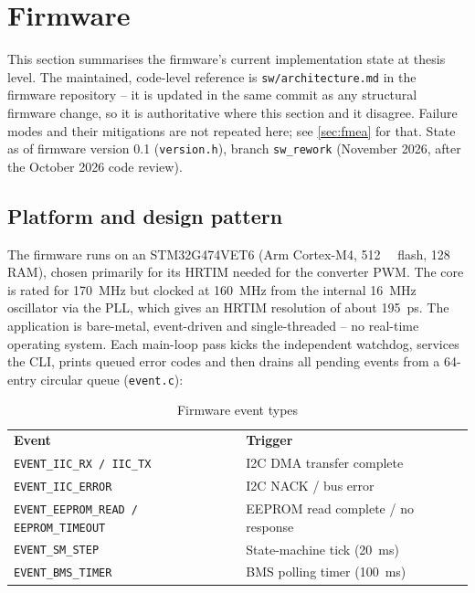 \section{Firmware}
\label{sec:firmware}

This section summarises the firmware's current implementation state at
thesis level. The maintained, code-level reference is
\texttt{sw/architecture.md} in the firmware repository -- it is updated in
the same commit as any structural firmware change, so it is authoritative
where this section and it disagree. Failure modes and their mitigations are
not repeated here; see \autoref{sec:fmea} for that. State as of firmware
version 0.1 (\texttt{version.h}), branch \texttt{sw\_rework} (November 2026,
after the October 2026 code review).

\FloatBarrier

\subsection{Platform and design pattern}

The firmware runs on an STM32G474VET6 (Arm Cortex-M4, \qty{512}{\kibi\byte} flash, \qty{128}{\kibi\byte} RAM), chosen primarily for its \ac{HRTIM} needed for the converter \ac{PWM}. The core is rated for \qty{170}{\mega\hertz} but clocked at \qty{160}{\mega\hertz} from the internal \qty{16}{\mega\hertz} oscillator via the PLL, which gives an \ac{HRTIM} resolution of about \qty{195}{\pico\second}. The application is bare-metal, event-driven and single-threaded -- no real-time operating system. Each main-loop pass kicks the independent watchdog, services the \ac{CLI}, prints queued error codes and then drains all pending events from a 64-entry circular queue (\texttt{event.c}):

\begin{table}[h!]
    \centering
    \begin{tabular}{ll}
        \rowcolor{gray} \textbf{Event} & \textbf{Trigger} \\
        \texttt{EVENT\_IIC\_RX / IIC\_TX} & \ac{I2C} \ac{DMA} transfer complete \\
        \texttt{EVENT\_IIC\_ERROR} & \ac{I2C} NACK / bus error \\
        \texttt{EVENT\_EEPROM\_READ / EEPROM\_TIMEOUT} & \ac{EEPROM} read complete / no response \\
        \texttt{EVENT\_SM\_STEP} & State-machine tick (\qty{20}{\milli\second}) \\
        \texttt{EVENT\_BMS\_TIMER} & \ac{BMS} polling timer (\qty{100}{\milli\second}) \\
    \end{tabular}
    \caption{Firmware event types}
\end{table}


